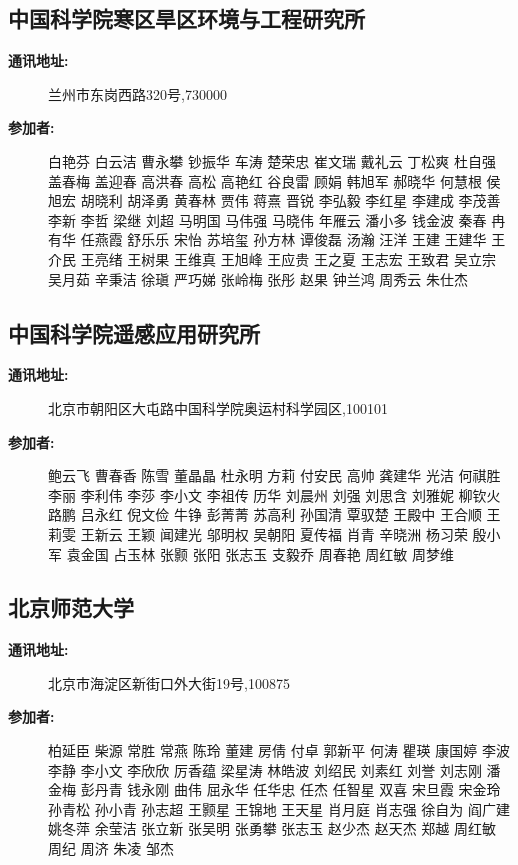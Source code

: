 \documentclass[letterpaper,10pt,english]{sphinxmanual}
\begin{document}
\subsection{中国科学院寒区旱区环境与工程研究所}
\label{water_partner:id3}\begin{description}
\item[{\textbf{通讯地址:}}] \leavevmode
兰州市东岗西路320号,730000

\item[{\textbf{参加者:}}] \leavevmode
白艳芬
白云洁
曹永攀
钞振华
车涛
楚荣忠
崔文瑞
戴礼云
丁松爽
杜自强
盖春梅
盖迎春
高洪春
高松
高艳红
谷良雷
顾娟
韩旭军
郝晓华
何慧根
侯旭宏
胡晓利
胡泽勇
黄春林
贾伟
蒋熹
晋锐
李弘毅
李红星
李建成
李茂善
李新
李哲
梁继
刘超
马明国
马伟强
马晓伟
年雁云
潘小多
钱金波
秦春
冉有华
任燕霞
舒乐乐
宋怡
苏培玺
孙方林
谭俊磊
汤瀚
汪洋
王建
王建华
王介民
王亮绪
王树果
王维真
王旭峰
王应贵
王之夏
王志宏
王致君
吴立宗
吴月茹
辛秉洁
徐瑱
严巧娣
张岭梅
张彤
赵果
钟兰鸿
周秀云
朱仕杰

\end{description}


\subsection{中国科学院遥感应用研究所}
\label{water_partner:id4}\begin{description}
\item[{\textbf{通讯地址:}}] \leavevmode
北京市朝阳区大屯路中国科学院奥运村科学园区,100101

\item[{\textbf{参加者:}}] \leavevmode
鲍云飞
曹春香
陈雪
董晶晶
杜永明
方莉
付安民
高帅
龚建华
光洁
何祺胜
李丽
李利伟
李莎
李小文
李祖传
历华
刘晨州
刘强
刘思含
刘雅妮
柳钦火
路鹏
吕永红
倪文俭
牛铮
彭菁菁
苏高利
孙国清
覃驭楚
王殿中
王合顺
王莉雯
王新云
王颖
闻建光
邬明权
吴朝阳
夏传福
肖青
辛晓洲
杨习荣
殷小军
袁金国
占玉林
张颢
张阳
张志玉
支毅乔
周春艳
周红敏
周梦维

\end{description}


\subsection{北京师范大学}
\label{water_partner:id5}\begin{description}
\item[{\textbf{通讯地址:}}] \leavevmode
北京市海淀区新街口外大街19号,100875

\item[{\textbf{参加者:}}] \leavevmode
柏延臣
柴源
常胜
常燕
陈玲
董建
房倩
付卓
郭新平
何涛
瞿瑛
康国婷
李波
李静
李小文
李欣欣
厉香蕴
梁星涛
林皓波
刘绍民
刘素红
刘誉
刘志刚
潘金梅
彭丹青
钱永刚
曲伟
屈永华
任华忠
任杰
任智星
双喜
宋旦霞
宋金玲
孙青松
孙小青
孙志超
王颢星
王锦地
王天星
肖月庭
肖志强
徐自为
阎广建
姚冬萍
余莹洁
张立新
张吴明
张勇攀
张志玉
赵少杰
赵天杰
郑越
周红敏
周纪
周济
朱凌
邹杰

\end{description}
\end{document}
